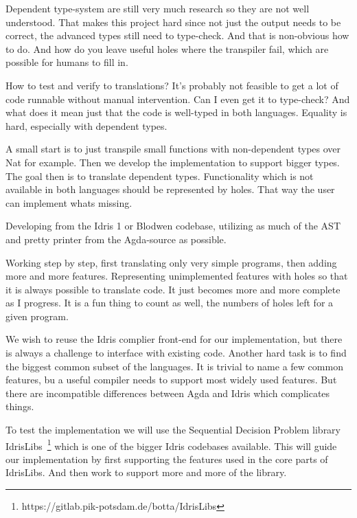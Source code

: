 \documentclass{scrartcl}
\begin{document}

Dependent type-system are still very much research so they are not
well understood. That makes this project hard since not just the output
needs to be correct, the advanced types still need to type-check. And that is
non-obvious how to do. And how do you leave useful holes where the transpiler
fail, which are possible for humans to fill in.

How to test and verify to translations? It's probably not feasible to get a lot
of code runnable without manual intervention. Can I even get it to type-check?
And what does it mean just that the code is well-typed in both languages.
Equality is hard, especially with dependent types.


A small start is to just transpile small functions with non-dependent types
over Nat for example. Then we develop the implementation to support bigger
types. The goal then is to translate dependent types.  Functionality which is
not available in both languages should be represented by holes. That way the
user can implement whats missing.

Developing from the Idris 1 or Blodwen codebase, utilizing as much of the AST
and pretty printer from the Agda-source as possible.

Working step by step, first translating only very simple programs, then adding
more and more features. Representing unimplemented features with holes so that
it is always possible to translate code. It just becomes more and more complete
as I progress. It is a fun thing to count as well, the numbers of holes left
for a given program.

We wish to reuse the Idris complier front-end for our
implementation, but there is always a challenge to interface with existing
code.  Another hard task is to find the biggest common subset of the languages.
It is trivial to name a few common features, bu a useful compiler needs to
support most widely used features. But there are incompatible differences
between Agda and Idris which complicates things.

To test the implementation we will use the Sequential Decision Problem library
IdrisLibs~\footnote{https://gitlab.pik-potsdam.de/botta/IdrisLibs} which is one
of the bigger Idris codebases available. This will guide our implementation by
first supporting the features used in the core parts of IdrisLibs. And then
work to support more and more of the library.
\end{document}
